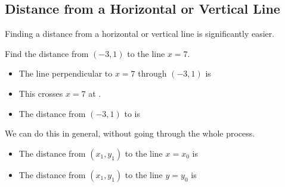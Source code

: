 \subsection{Distance from a Horizontal or Vertical Line} 
Finding a distance from a horizontal or vertical line is significantly easier.
\begin{Example}
Find the distance from $(-3,1)$ to the line $x=7$.
\begin{itemize}
\item The line perpendicular to $x=7$ through $(-3,1)$ is \makeblank[1in]
\item This crosses $x=7$ at \blankpair.
\item The distance from $(-3,1)$ to \blankpair is \makeblank[1.5in]
\end{itemize}
\end{Example}
We can do this in general, without going through the whole process.
\begin{itemize}
\item The distance from $(x_1,y_1)$ to the \makeblank[1in] line $x=x_0$ is \makeblank[1in]
\item The distance from $(x_1,y_1)$ to the \makeblank[1in] line $y=y_0$ is \makeblank[1in]
\end{itemize}